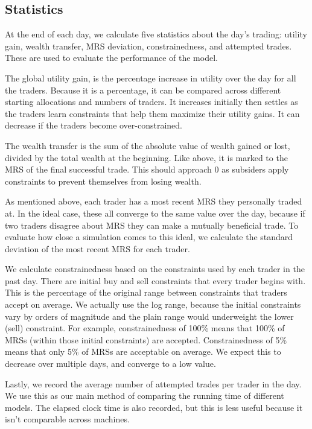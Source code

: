 \documentclass[12pt,a4paper,titlepage]{article}
\begin{document}
\subsection{Statistics}
At the end of each day, we calculate five statistics about the day's trading: utility gain, wealth transfer, MRS deviation, constrainedness, and attempted trades.
These are used to evaluate the performance of the model.

The global utility gain, is the percentage increase in utility over the day for all the traders. 
Because it is a percentage, it can be compared across different starting allocations and numbers of traders.
It increases initially then settles as the traders learn constraints that help them maximize their utility gains.
It can decrease if the traders become over-constrained.

The wealth transfer is the sum of the absolute value of wealth gained or lost, divided by the total wealth at the beginning.
Like above, it is marked to the MRS of the final successful trade.
This should approach 0 as subsiders apply constraints to prevent themselves from losing wealth.

As mentioned above, each trader has a most recent MRS they personally traded at.
In the ideal case, these all converge to the same value over the day, because if two traders disagree about MRS they can make a mutually beneficial trade.
To evaluate how close a simulation comes to this ideal, we calculate the standard deviation of the most recent MRS for each trader.

We calculate constrainedness based on the constraints used by each trader in the past day.
There are initial buy and sell constraints that every trader begins with.
This is the percentage of the original range between constraints that traders accept on average.
We actually use the log range, because the initial constraints vary by orders of magnitude and the plain range would underweight the lower (sell) constraint.
For example, constrainedness of 100\% means that 100\% of MRSs (within those initial constraints) are accepted.
Constrainedness of 5\% means that only 5\% of MRSs are acceptable on average.
We expect this to decrease over multiple days, and converge to a low value.

Lastly, we record the average number of attempted trades per trader in the day.
We use this as our main method of comparing the running time of different models.
The elapsed clock time is also recorded, but this is less useful because it isn't comparable across machines.
\end{document}
